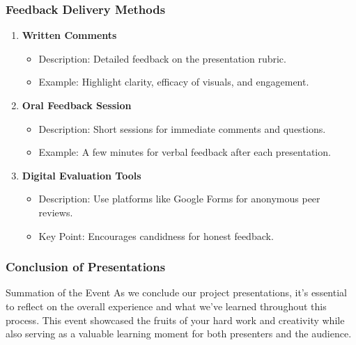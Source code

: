 \documentclass[aspectratio=169]{beamer}
\begin{document}
\begin{frame}[fragile]
  \frametitle{Feedback Delivery Methods}
  \begin{enumerate}
    \item \textbf{Written Comments}
      \begin{itemize}
        \item Description: Detailed feedback on the presentation rubric.
        \item Example: Highlight clarity, efficacy of visuals, and engagement.
      \end{itemize}
    
    \item \textbf{Oral Feedback Session}
      \begin{itemize}
        \item Description: Short sessions for immediate comments and questions.
        \item Example: A few minutes for verbal feedback after each presentation.
      \end{itemize}

    \item \textbf{Digital Evaluation Tools}
      \begin{itemize}
        \item Description: Use platforms like Google Forms for anonymous peer reviews.
        \item Key Point: Encourages candidness for honest feedback.
      \end{itemize}
  \end{enumerate}
\end{frame}

\begin{frame}[fragile]
  \frametitle{Conclusion of Presentations}
  \begin{block}{Summation of the Event}
    As we conclude our project presentations, it’s essential to reflect on the overall experience and what we've learned throughout this process. This event showcased the fruits of your hard work and creativity while also serving as a valuable learning moment for both presenters and the audience.
  \end{block}
\end{frame}
\end{document}

